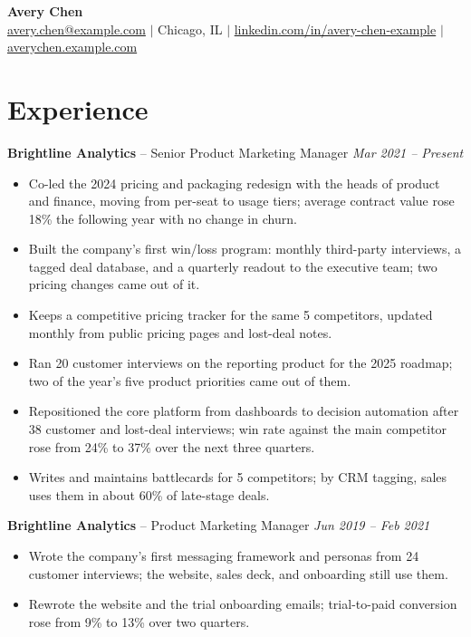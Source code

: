 \documentclass[11pt, letterpaper]{article}
\begin{document}
\pagestyle{empty}

\begin{center}
  \textbf{\LARGE Avery Chen} \\[2pt]
  \href{mailto:avery.chen@example.com}{avery.chen@example.com} $|$ Chicago, IL $|$ \href{https://linkedin.com/in/avery-chen-example}{linkedin.com/in/avery-chen-example} $|$ \href{https://averychen.example.com}{averychen.example.com}
\end{center}
\vspace{-15pt}

\section{Experience}

\textbf{Brightline Analytics} -- {Senior Product Marketing Manager}
\hfill \textit{Mar 2021 – Present}
\begin{itemize}
  \item Co-led the 2024 pricing and packaging redesign with the heads of product and finance, moving from per-seat to usage tiers; average contract value rose 18\% the following year with no change in churn.
  \item Built the company's first win/loss program: monthly third-party interviews, a tagged deal database, and a quarterly readout to the executive team; two pricing changes came out of it.
  \item Keeps a competitive pricing tracker for the same 5 competitors, updated monthly from public pricing pages and lost-deal notes.
  \item Ran 20 customer interviews on the reporting product for the 2025 roadmap; two of the year's five product priorities came out of them.
  \item Repositioned the core platform from dashboards to decision automation after 38 customer and lost-deal interviews; win rate against the main competitor rose from 24\% to 37\% over the next three quarters.
  \item Writes and maintains battlecards for 5 competitors; by CRM tagging, sales uses them in about 60\% of late-stage deals.
\end{itemize}
\vspace{2pt}
\textbf{Brightline Analytics} -- {Product Marketing Manager}
\hfill \textit{Jun 2019 – Feb 2021}
\begin{itemize}
  \item Wrote the company's first messaging framework and personas from 24 customer interviews; the website, sales deck, and onboarding still use them.
  \item Rewrote the website and the trial onboarding emails; trial-to-paid conversion rose from 9\% to 13\% over two quarters.
\end{itemize}
\end{document}
